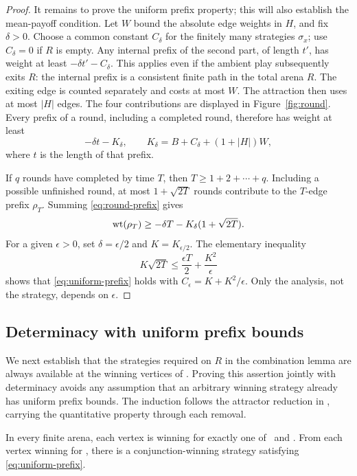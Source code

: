 \begin{proof}
It remains to prove the uniform prefix property; this will also establish
the mean-payoff condition.  Let $W$ bound the absolute edge weights in
$H$, and fix $\delta>0$.  Choose a common constant $C_\delta$ for the
finitely many strategies $\sigma_x$; use $C_\delta=0$ if $R$ is empty.
Any internal prefix of the second part, of length $t'$, has weight at
least $-\delta t'-C_\delta$.  This applies even if the ambient play
subsequently exits $R$: the internal prefix is a consistent finite path
in the total arena $R$.  The exiting edge is counted separately and
costs at most $W$.  The attraction then uses at most $|H|$ edges.
The four contributions are displayed in Figure~\ref{fig:round}.
Every prefix of a round, including a completed round, therefore has
weight at least
\begin{equation}
  \label{eq:round-prefix}
  -\delta t-K_\delta,
  \qquad
  K_\delta=B+C_\delta+(1+|H|)W,
\end{equation}
where $t$ is the length of that prefix.

If $q$ rounds have completed by time $T$, then
$T\geq 1+2+\cdots+q$.  Including a possible unfinished round, at most
$1+\sqrt{2T}$ rounds contribute to the $T$-edge prefix $\rho_T$.
Summing \eqref{eq:round-prefix} gives
\[
  \operatorname{wt}(\rho_T)\geq-\delta T-K_\delta(1+\sqrt{2T}).
\]
For a given $\epsilon>0$, set $\delta=\epsilon/2$ and
$K=K_{\epsilon/2}$.  The elementary inequality
\[
  K\sqrt{2T}\leq\frac{\epsilon T}{2}+\frac{K^2}{\epsilon}
\]
shows that \eqref{eq:uniform-prefix} holds with
$C_\epsilon=K+K^2/\epsilon$.  Only the analysis, not the strategy,
depends on $\epsilon$.
\end{proof}



\subsection{Determinacy with uniform prefix bounds}

We next establish that the strategies required on $R$ in the combination
lemma are always available at the winning vertices of \Max.  Proving
this assertion jointly with determinacy avoids any assumption that an
arbitrary winning strategy already has uniform prefix bounds.
The induction follows the attractor reduction in
\cite[Algorithm~3 and Appendix~C]{ChatterjeeHenzingerSvozil2017},
carrying the quantitative property through each removal.

\begin{theorem}
\label{thm:determinacy}
In every finite arena, each vertex is winning for exactly one of \Max\
and \Min.  From each vertex winning for \Max, there is a
conjunction-winning strategy satisfying \eqref{eq:uniform-prefix}.
\end{theorem}

